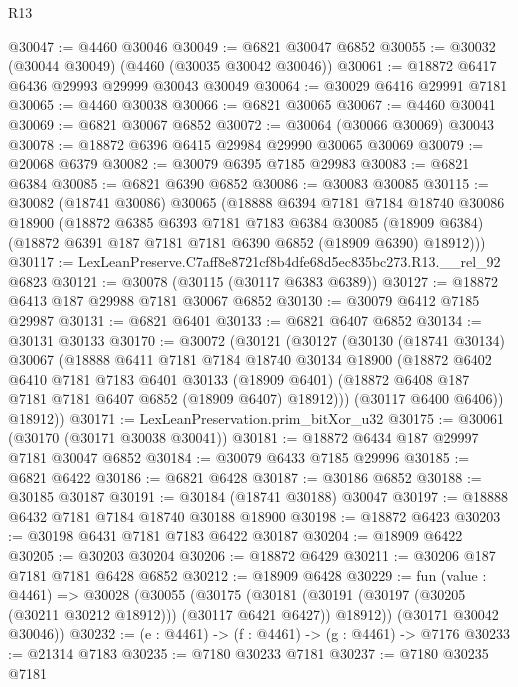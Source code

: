 \begin{lexlean}{R13}
\begin{coremodule}
@30047 := @4460 @30046
@30049 := @6821 @30047 @6852
@30055 := @30032 (@30044 @30049) (@4460 (@30035 @30042 @30046))
@30061 := @18872 @6417 @6436 @29993 @29999 @30043 @30049
@30064 := @30029 @6416 @29991 @7181
@30065 := @4460 @30038
@30066 := @6821 @30065
@30067 := @4460 @30041
@30069 := @6821 @30067 @6852
@30072 := @30064 (@30066 @30069) @30043
@30078 := @18872 @6396 @6415 @29984 @29990 @30065 @30069
@30079 := @20068 @6379
@30082 := @30079 @6395 @7185 @29983
@30083 := @6821 @6384
@30085 := @6821 @6390 @6852
@30086 := @30083 @30085
@30115 := @30082
    (@18741 @30086)
    @30065
    (@18888
      @6394
      @7181
      @7184
      @18740
      @30086
      @18900
      (@18872
        @6385
        @6393
        @7181
        @7183
        @6384
        @30085
        (@18909 @6384)
        (@18872 @6391 @187 @7181 @7181 @6390 @6852 (@18909 @6390) @18912)))
@30117 := LexLeanPreserve.C7aff8e8721cf8b4dfe68d5ec835bc273.R13.__rel_92 @6823
@30121 := @30078 (@30115 (@30117 @6383 @6389))
@30127 := @18872 @6413 @187 @29988 @7181 @30067 @6852
@30130 := @30079 @6412 @7185 @29987
@30131 := @6821 @6401
@30133 := @6821 @6407 @6852
@30134 := @30131 @30133
@30170 := @30072
    (@30121
      (@30127
        (@30130
          (@18741 @30134)
          @30067
          (@18888
            @6411
            @7181
            @7184
            @18740
            @30134
            @18900
            (@18872
              @6402
              @6410
              @7181
              @7183
              @6401
              @30133
              (@18909 @6401)
              (@18872 @6408 @187 @7181 @7181 @6407 @6852 (@18909 @6407) @18912)))
          (@30117 @6400 @6406))
        @18912))
@30171 := LexLeanPreservation.prim_bitXor_u32
@30175 := @30061 (@30170 (@30171 @30038 @30041))
@30181 := @18872 @6434 @187 @29997 @7181 @30047 @6852
@30184 := @30079 @6433 @7185 @29996
@30185 := @6821 @6422
@30186 := @6821 @6428
@30187 := @30186 @6852
@30188 := @30185 @30187
@30191 := @30184 (@18741 @30188) @30047
@30197 := @18888 @6432 @7181 @7184 @18740 @30188 @18900
@30198 := @18872 @6423
@30203 := @30198 @6431 @7181 @7183 @6422 @30187
@30204 := @18909 @6422
@30205 := @30203 @30204
@30206 := @18872 @6429
@30211 := @30206 @187 @7181 @7181 @6428 @6852
@30212 := @18909 @6428
@30229 := fun (value : @4461) =>
  @30028
    (@30055
      (@30175
        (@30181 (@30191 (@30197 (@30205 (@30211 @30212 @18912))) (@30117 @6421 @6427)) @18912))
      (@30171 @30042 @30046))
@30232 := (e : @4461) -> (f : @4461) -> (g : @4461) -> @7176
@30233 := @21314 @7183
@30235 := @7180 @30233 @7181
@30237 := @7180 @30235 @7181

\end{coremodule}
\end{lexlean}
